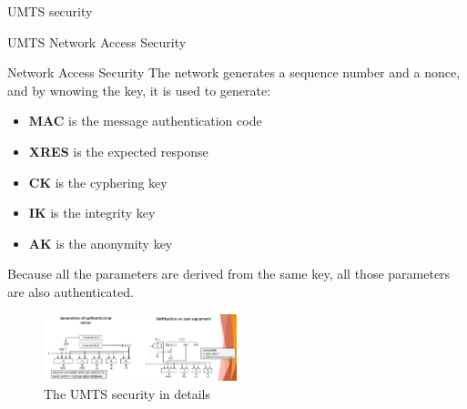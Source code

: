 \begin{section}{UMTS security}
\begin{subsection}{UMTS Network Access Security}
\begin{subsubsection}{Network Access Security}
        The network generates a sequence number and a nonce, and by wnowing the key, it is used to
        generate: 
        \begin{itemize}
          \item \textbf{MAC} is the message authentication code
          \item \textbf{XRES} is the expected response
          \item \textbf{CK} is the cyphering key
          \item \textbf{IK} is the integrity key
          \item \textbf{AK} is the anonymity key
        \end{itemize}
        Because all the parameters are derived from the same key, all those parameters are also
        authenticated.

        \begin{figure}[h]
          \centering
          \includegraphics[width=0.5\textwidth]{img/wireless/umts authentication 2.png}
          \caption{The UMTS security in details}
        \end{figure}

      \end{subsubsection}

    \end{subsection}

  \end{section}
